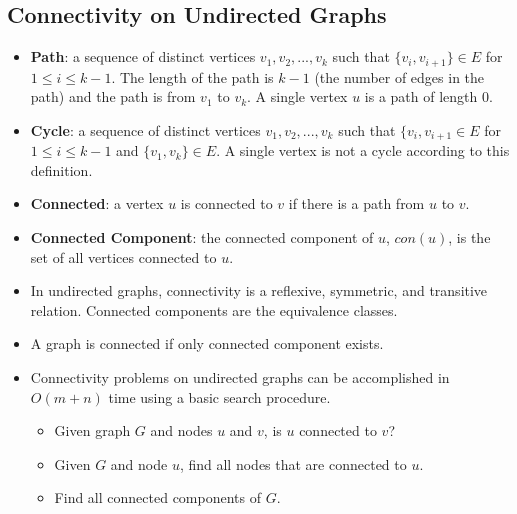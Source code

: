 \subsection{Connectivity on Undirected Graphs}
\begin{itemize}
    \item \textbf{Path}: a sequence of distinct vertices $v_1, v_2, ..., v_k$ such that $\{ v_i, v_{i + 1} \} \in E$ for $1 \leq i \leq k - 1$. The length of the path is $k - 1$ (the number of edges in the path) and the path is from $v_1$ to $v_k$. A single vertex $u$ is a path of length $0$.
    \item \textbf{Cycle}: a sequence of distinct vertices $v_1, v_2, ..., v_k$ such that $\{ v_i, v_{i + 1} \in E$ for $1 \leq i \leq k - 1$ and $\{ v_1, v_k \} \in E$. A single vertex is not a cycle according to this definition.
    \item \textbf{Connected}: a vertex $u$ is connected to $v$ if there is a path from $u$ to $v$.
    \item \textbf{Connected Component}: the connected component of $u$, $con(u)$, is the set of all vertices connected to $u$.
    \item In undirected graphs, connectivity is a reflexive, symmetric, and transitive relation. Connected components are the equivalence classes.
    \item A graph is connected if only connected component exists.
    \item Connectivity problems on undirected graphs can be accomplished in $O(m + n)$ time using a basic search procedure.
    \begin{itemize}
        \item Given graph $G$ and nodes $u$ and $v$, is $u$ connected to $v$?
        \item Given $G$ and node $u$, find all nodes that are connected to $u$.
        \item Find all connected components of $G$.
    \end{itemize}
\end{itemize}

